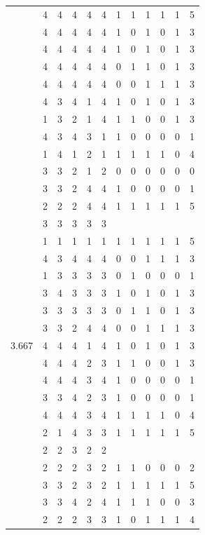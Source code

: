 \documentclass[]{book}
\theoremstyle{definition}
\theoremstyle{definition}
\theoremstyle{definition}
\theoremstyle{remark}
\begin{document}
\begin{table}
{\begin{tabular}[t]{rrrrrrrrrrrr}
 & 4 & 4 & 4 & 4 & 4 & 1 & 1 & 1 & 1 & 1 & 5\\
 & 4 & 4 & 4 & 4 & 4 & 1 & 0 & 1 & 0 & 1 & 3\\
 & 4 & 4 & 4 & 4 & 4 & 1 & 0 & 1 & 0 & 1 & 3\\
 & 4 & 4 & 4 & 4 & 4 & 0 & 1 & 1 & 0 & 1 & 3\\
 & 4 & 4 & 4 & 4 & 4 & 0 & 0 & 1 & 1 & 1 & 3\\
 & 4 & 3 & 4 & 1 & 4 & 1 & 0 & 1 & 0 & 1 & 3\\
 & 1 & 3 & 2 & 1 & 4 & 1 & 1 & 0 & 0 & 1 & 3\\
 & 4 & 3 & 4 & 3 & 1 & 1 & 0 & 0 & 0 & 0 & 1\\
 & 1 & 4 & 1 & 2 & 1 & 1 & 1 & 1 & 1 & 0 & 4\\
 & 3 & 3 & 2 & 1 & 2 & 0 & 0 & 0 & 0 & 0 & 0\\
 & 3 & 3 & 2 & 4 & 4 & 1 & 0 & 0 & 0 & 0 & 1\\
 & 2 & 2 & 2 & 4 & 4 & 1 & 1 & 1 & 1 & 1 & 5\\
 & 3 & 3 & 3 & 3 & 3 &  &  &  &  &  & \\
 & 1 & 1 & 1 & 1 & 1 & 1 & 1 & 1 & 1 & 1 & 5\\
 & 4 & 3 & 4 & 4 & 4 & 0 & 0 & 1 & 1 & 1 & 3\\
 & 1 & 3 & 3 & 3 & 3 & 0 & 1 & 0 & 0 & 0 & 1\\
 & 3 & 4 & 3 & 3 & 3 & 1 & 0 & 1 & 0 & 1 & 3\\
 & 3 & 3 & 3 & 3 & 3 & 0 & 1 & 1 & 0 & 1 & 3\\
 & 3 & 3 & 2 & 4 & 4 & 0 & 0 & 1 & 1 & 1 & 3\\
3.667 & 4 & 4 & 4 & 1 & 4 & 1 & 0 & 1 & 0 & 1 & 3\\
 & 4 & 4 & 4 & 2 & 3 & 1 & 1 & 0 & 0 & 1 & 3\\
 & 4 & 4 & 4 & 3 & 4 & 1 & 0 & 0 & 0 & 0 & 1\\
 & 3 & 3 & 4 & 2 & 3 & 1 & 0 & 0 & 0 & 0 & 1\\
 & 4 & 4 & 4 & 3 & 4 & 1 & 1 & 1 & 1 & 0 & 4\\
 & 2 & 1 & 4 & 3 & 3 & 1 & 1 & 1 & 1 & 1 & 5\\
 & 2 & 2 & 3 & 2 & 2 &  &  &  &  &  & \\
 & 2 & 2 & 2 & 3 & 2 & 1 & 1 & 0 & 0 & 0 & 2\\
 & 3 & 3 & 2 & 3 & 2 & 1 & 1 & 1 & 1 & 1 & 5\\
 & 3 & 3 & 4 & 2 & 4 & 1 & 1 & 1 & 0 & 0 & 3\\
 & 2 & 2 & 2 & 3 & 3 & 1 & 0 & 1 & 1 & 1 & 4\\

\end{tabular}}
\end{table}
\end{document}

